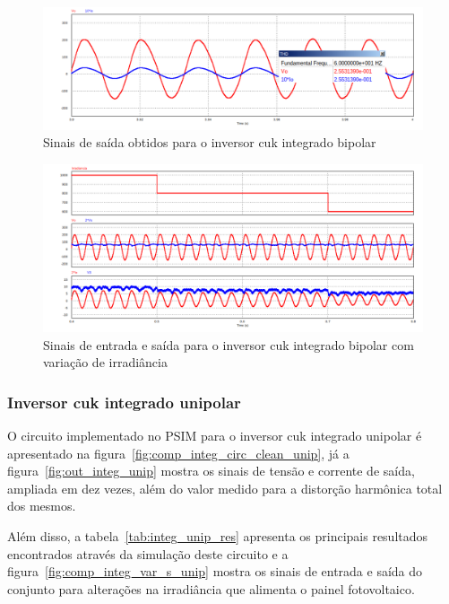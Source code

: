 \documentclass[
	12pt,				%
	openany,
	onseside,
	a4paper,			%
	english,			%
	french,				%
	spanish,			%
	brazil,				%
	]{abntex2}
\begin{document}
\begin{figure}[H]%
	\captionsetup{justification=centering}
	\centering
		\includegraphics[width= \linewidth]{integ_Vo_10Io_comp}
		\caption{Sinais de saída obtidos para o inversor cuk integrado bipolar}
		\label{fig:out_integ_bip}
\end{figure}

\begin{figure}[H]%
	\captionsetup{justification=centering}
	\centering
		\includegraphics[width= \linewidth]{comp_integ_var_s}
		\caption{Sinais de entrada e saída para o inversor cuk integrado bipolar com variação de irradiância}
		\label{fig:comp_integ_var_s}
\end{figure}

\subsubsection{Inversor cuk integrado unipolar}

O circuito implementado no PSIM para o inversor cuk integrado unipolar é apresentado na figura~\ref{fig:comp_integ_circ_clean_unip}, já a figura~\ref{fig:out_integ_unip} mostra os sinais de tensão e corrente de saída, ampliada em dez vezes, além do valor medido para a distorção harmônica total dos mesmos.

Além disso, a tabela~\ref{tab:integ_unip_res} apresenta os principais resultados encontrados através da simulação deste circuito e a figura~\ref{fig:comp_integ_var_s_unip} mostra os sinais de entrada e saída do conjunto para alterações na irradiância que alimenta o painel fotovoltaico.
\end{document}
